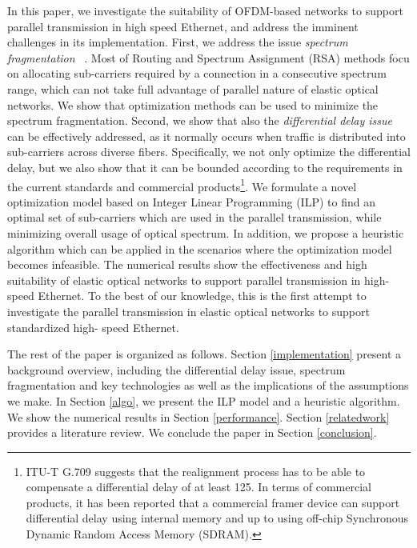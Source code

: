 \documentclass[conference]{IEEEtran}
\begin{document}
 
\par In this paper, we investigate the suitability of OFDM-based networks to support parallel transmission in high speed 
Ethernet, and address the imminent challenges in its implementation. First, we address the issue \emph{spectrum 
fragmentation} ~\cite{Chen:infocom:2013}\cite{Chen:ICC:2013}.  Most of Routing and Spectrum Assignment 
(RSA) methods focu on allocating sub-carriers required by a connection in a consecutive spectrum range, which can not take full advantage of parallel nature of elastic optical networks. We show that optimization methods can be used to 
minimize the  spectrum fragmentation. Second, we show that also the \emph{differential delay issue} can be 
effectively addressed, as it normally occurs when traffic is distributed into sub-carriers across diverse fibers. 
Specifically, we not only optimize the differential delay, but we also show that it can be bounded according to the 
requirements in the current standards and commercial products\footnote{ITU-T G.709 \cite{ITU-T:G.709} suggests 
that the realignment process has to be able to compensate a differential delay of at least 125. In terms of 
commercial products, it has been reported that a commercial framer device can support  differential delay 
using internal memory and up to  using off-chip Synchronous Dynamic Random Access Memory 
(SDRAM)\cite{cisco}\cite{Intel:datasheet}.}.  We formulate a novel optimization model based on Integer Linear 
Programming (ILP) to find an optimal set of sub-carriers which are used in the parallel transmission, while minimizing 
overall usage of optical spectrum. In addition, we propose a heuristic algorithm which can be applied in the scenarios  
where the optimization model becomes infeasible.    The numerical results show the effectiveness and high suitability 
of elastic optical networks to support parallel transmission in high-speed Ethernet.  To the best of our knowledge, this 
is the first attempt to investigate the parallel transmission in elastic optical networks to support standardized high-
speed Ethernet.

\par The rest of the paper is organized as follows. Section \ref{implementation} present a background overview, 
 including the differential delay issue, spectrum fragmentation and  key  technologies  as well as the implications of the assumptions we make. In Section \ref{algo}, we present the ILP model  and a heuristic algorithm. We show the numerical results in  Section \ref{performance}. Section \ref{relatedwork} provides a literature review.   We conclude the paper in  Section \ref{conclusion}. 
\end{document}
